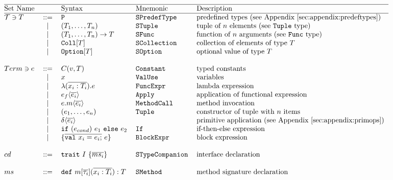 \[\begin{tabular}{@{}l c l l l} 
\hline
Set Name				&  			& Syntax	& Mnemonic 		& Description \\
\hline
$\mathcal{T} \ni T$	& ::= 		& \lst{P} 	& \lst{SPredefType}	& predefined types (see Appendix~\ref{sec:appendix:predeftypes}) \\

			&	$\mid$	& $(T_1, \dots ,T_n) $	& \lst{STuple} & tuple of $n$ elements (see \lst{Tuple} type)\\

			&   $\mid$  & $(T_1,\dots,T_n) \to T $	& \lst{SFunc} & function of $n$ arguments (see \lst{Func} type) \\
			&   $\mid$  & $\text{\lst{Coll}}[T]$			& \lst{SCollection} & collection of elements of type $T$   \\
			&   $\mid$  & $\text{\lst{Option}}[T]$		& \lst{SOption} & optional value of type $T$  \\
			& 	     	&									& 				&		\\

$Term\ni e$	& ::= 		&   $C(v, T)$				& \lst{Constant} & typed constants  \\
			& 	$\mid$ 	& 	$x$ 					& \lst{ValUse} & variables  \\
			& 	$\mid$ 	& 	$\TyLam{x_i}{T_i}{e}$ 		& \lst{FuncExpr} & lambda expression \\
			& 	$\mid$ 	& 	$\Apply{e_f}{\Ov{e_i}}$ 	& \lst{Apply} & application of functional expression \\
			& 	$\mid$ 	& 	$\Apply{e.m}{\Ov{e_i}}$		& \lst{MethodCall} & method invocation  \\
			& 	$\mid$ 	&   $\Tup{e_1, \dots ,e_n}$ 	& \lst{Tuple} & constructor of tuple with $n$ items \\
			& 	$\mid$ 	& 	$\Apply{\delta}{\Ov{e_i}}$ 	& & primitive application (see Appendix~\ref{sec:appendix:primops}) \\
			& 	$\mid$ 	& 	\lst{if} $(e_{cond})$ $e_1$ \lst{else} $e_2$ & \lst{If} & if-then-else expression \\
			& 	$\mid$ 	&   $\{ \Ov{\text{\lst{val}}~x_i = e_i;}~e\}$  & \lst{BlockExpr} & block expression \\
			& 	     	&										& &				\\
$cd$   		& ::= 		& 	$\Trait{I}{\Ov{ms_i}}$				& \lst{STypeCompanion} & interface declaration    \\
			& 	     	&										& &				\\
$ms$	   	& ::= 	& $\MSig{m[\Ov{\tau_i}]}{\overline{x_i : T_i}}{T}$ 	& \lst{SMethod} & method signature declaration   \\
\end{tabular}\] 

